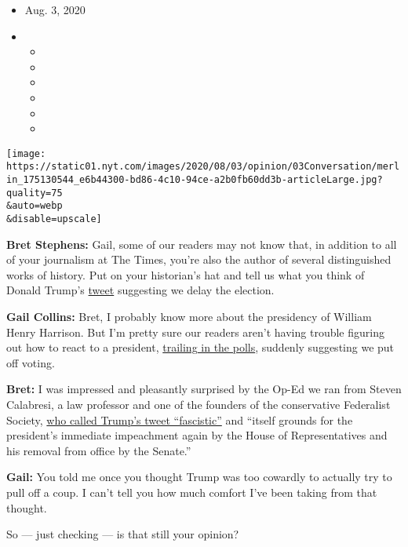 \begin{itemize}
\item
  Aug. 3, 2020
\item
  \begin{itemize}
  \item
  \item
  \item
  \item
  \item
  \item
  \end{itemize}
\end{itemize}

\texttt{[image: https://static01.nyt.com/images/2020/08/03/opinion/03Conversation/merlin\_175130544\_e6b44300-bd86-4c10-94ce-a2b0fb60dd3b-articleLarge.jpg?quality=75\\\&auto=webp\\\&disable=upscale]}

\textbf{Bret Stephens:} Gail, some of our readers may not know that, in
addition to all of your journalism at The Times, you're also the author
of several distinguished works of history. Put on your historian's hat
and tell us what you think of Donald Trump's
\href{https://twitter.com/realDonaldTrump/status/1288818160389558273?ref_src=twsrc\%5Etfw\%7Ctwcamp\%5Etweetembed\%7Ctwterm\%5E1288818160389558273\%7Ctwgr\%5E\&ref_url=https\%3A\%2F\%2Fwww.nytimes.com\%2F2020\%2F07\%2F30\%2Fopinion\%2Ftrump-delay-election-coronavirus.html}{tweet}
suggesting we delay the election.

\textbf{Gail Collins:} Bret, I probably know more about the presidency
of William Henry Harrison. But I'm pretty sure our readers aren't having
trouble figuring out how to react to a president,
\href{https://projects.fivethirtyeight.com/polls/president-general/}{trailing
in the polls}, suddenly suggesting we put off voting.

\textbf{Bret:} I was impressed and pleasantly surprised by the Op-Ed we
ran from Steven Calabresi, a law professor and one of the founders of
the conservative Federalist Society,
\href{https://www.nytimes.com/2020/07/30/opinion/trump-delay-election-coronavirus.html}{who
called Trump's tweet ``fascistic''} and ``itself grounds for the
president's immediate impeachment again by the House of Representatives
and his removal from office by the Senate.''

\textbf{Gail:} You told me once you thought Trump was too cowardly to
actually try to pull off a coup. I can't tell you how much comfort I've
been taking from that thought.

So --- just checking --- is that still your opinion?

